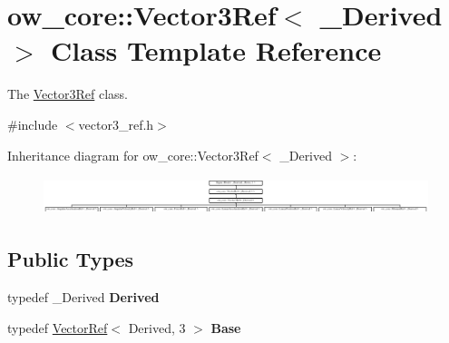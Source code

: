 \hypertarget{classow__core_1_1Vector3Ref}{}\section{ow\+\_\+core\+:\+:Vector3\+Ref$<$ \+\_\+\+Derived $>$ Class Template Reference}
\label{classow__core_1_1Vector3Ref}


The \hyperlink{classow__core_1_1Vector3Ref}{Vector3\+Ref} class.  




{\ttfamily \#include $<$vector3\+\_\+ref.\+h$>$}

Inheritance diagram for ow\+\_\+core\+:\+:Vector3\+Ref$<$ \+\_\+\+Derived $>$\+:\begin{figure}[H]
\begin{center}
\leavevmode
\includegraphics[height=1.114983cm]{d2/d0b/classow__core_1_1Vector3Ref}
\end{center}
\end{figure}
\subsection*{Public Types}
\begin{DoxyCompactItemize}
\item 
typedef \+\_\+\+Derived {\bfseries Derived}\hypertarget{classow__core_1_1Vector3Ref_aa0de46e47cfd8bc910d62ba5b3d5941c}{}\label{classow__core_1_1Vector3Ref_aa0de46e47cfd8bc910d62ba5b3d5941c}

\item 
typedef \hyperlink{classow__core_1_1VectorRef}{Vector\+Ref}$<$ Derived, 3 $>$ {\bfseries Base}\hypertarget{classow__core_1_1Vector3Ref_acda9aca9c1bf20bdd01ac037c1890055}{}\label{classow__core_1_1Vector3Ref_acda9aca9c1bf20bdd01ac037c1890055}

\end{DoxyCompactItemize}
